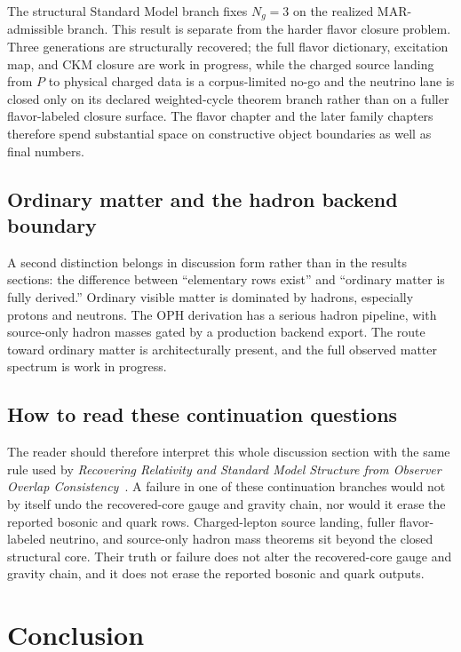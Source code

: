 \documentclass[11pt]{article}
\begin{document}
The structural Standard Model branch fixes \(N_g=3\) on the realized MAR-admissible
branch. This result is separate from the harder flavor
closure problem. Three generations are structurally recovered; the full flavor dictionary,
excitation map, and CKM closure are work in progress, while the charged source landing from \(P\) to physical charged data is a corpus-limited no-go and the neutrino
lane is closed only on its declared weighted-cycle theorem branch rather than on a fuller
flavor-labeled closure surface.
The flavor chapter and the later family chapters therefore spend substantial space on
constructive object boundaries as well as final numbers.

\subsection{Ordinary matter and the hadron backend boundary}

A second distinction belongs in discussion form rather than in the results sections: the
difference between ``elementary rows exist'' and ``ordinary matter is fully derived.'' Ordinary
visible matter is dominated by hadrons, especially protons and neutrons. The OPH
derivation has a serious hadron pipeline, with source-only hadron masses gated by a production
backend export. The route toward ordinary matter is architecturally present, and the full
observed matter spectrum is work in progress.

\subsection{How to read these continuation questions}

The reader should therefore interpret this whole discussion section with the same rule used by
\emph{Recovering Relativity and Standard Model Structure from Observer Overlap Consistency}~\cite{ophcompact}. A failure in one of these continuation branches would not by itself undo the
recovered-core gauge and gravity chain, nor would it erase the reported bosonic and quark
rows. Charged-lepton source landing, fuller flavor-labeled neutrino, and source-only hadron mass theorems sit beyond the
closed structural core. Their truth or failure does not alter the recovered-core gauge and
gravity chain, and it does not erase the reported bosonic and quark outputs.

\section{Conclusion}
\end{document}
